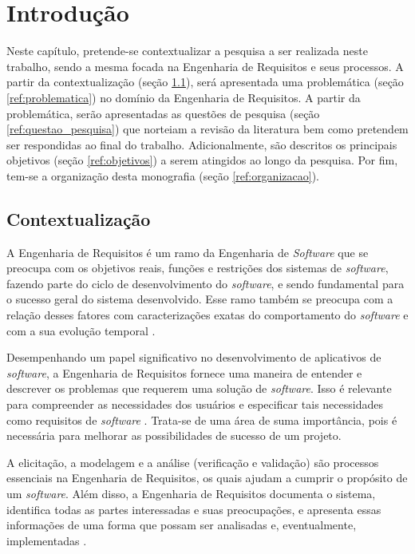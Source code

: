 \chapter[Introdução]{Introdução}

Neste capítulo, pretende-se contextualizar a pesquisa a ser realizada neste trabalho, sendo a mesma focada na Engenharia de Requisitos e seus processos. A partir da contextualização (seção \ref{ref:contextualizacao}), será apresentada uma problemática (seção \ref{ref:problematica}) no domínio da Engenharia de Requisitos. A partir da problemática, serão apresentadas as questões de pesquisa (seção \ref{ref:questao_pesquisa}) que norteiam a revisão da literatura bem como pretendem ser respondidas ao final do trabalho. Adicionalmente, são descritos os principais objetivos (seção \ref{ref:objetivos}) a serem atingidos ao longo da pesquisa. Por fim, tem-se a organização desta monografia (seção \ref{ref:organizacao}).

\label{chap:intro}

\section{Contextualização}

\label{ref:contextualizacao}

A Engenharia de Requisitos é um ramo da Engenharia de \textit{Software} que se preocupa com os objetivos reais, funções e restrições dos sistemas de \textit{software}, fazendo parte do ciclo de desenvolvimento do \textit{software}, e sendo fundamental para o sucesso geral do sistema desenvolvido. Esse ramo também se preocupa com a relação desses fatores com caracterizações exatas do comportamento do \textit{software} e com a sua evolução temporal \cite{elliott2012software}.

Desempenhando um papel significativo no desenvolvimento de aplicativos de \textit{software}, a Engenharia de Requisitos fornece uma maneira de entender e descrever os problemas que requerem uma solução de \textit{software}. Isso é relevante para compreender as necessidades dos usuários e especificar tais necessidades como requisitos de \textit{software} \cite{elliott2012software}. Trata-se de uma área de suma importância, pois é necessária para melhorar as possibilidades de sucesso de um projeto.

A elicitação, a modelagem e a análise (verificação e validação) são processos essenciais na Engenharia de Requisitos, os quais ajudam a cumprir o propósito de um \textit{software}. Além disso, a Engenharia de Requisitos documenta o sistema, identifica todas as partes interessadas e suas preocupações, e apresenta essas informações de uma forma que possam ser analisadas e, eventualmente, implementadas \cite{elliott2012software}.

